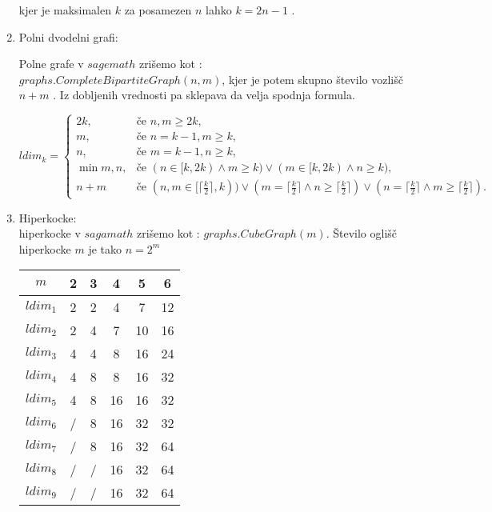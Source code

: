 \documentclass[12pt,a4paper]{amsart}
\theoremstyle{plain} %
\begin{document}
\begin{enumerate}
kjer je maksimalen $k$ za posamezen $n$ lahko $k = 2n -1$ .

\newpage

\item Polni dvodelni grafi:

Polne grafe v $sagemath$ zrišemo kot : $graphs.CompleteBipartiteGraph(n, m)$, kjer je potem skupno število vozlišč $n+m$ . 
Iz dobljenih vrednosti pa sklepava da velja spodnja formula. 

\begin{equation}
ldim_k =
\begin{cases}
  2k, & \text{če } n,m \geq 2k, \\
  m, & \text{če } n = k-1, m\geq k,\\
  n, & \text{če } m = k-1, n\geq k,\\
  \min{m,n}, & \text{če } (n \in [k,2k) \land  m\geq k) \lor (m \in [k,2k) \land  n\geq k) , \\
  n+m & \text{če } (n,m \in [\lceil \frac{k}{2} \rceil,k) ) \lor
  (m = \lceil \frac{k}{2} \rceil \land  n\geq \lceil \frac{k}{2} \rceil)  \lor
  (n = \lceil \frac{k}{2} \rceil \land  m\geq \lceil \frac{k}{2} \rceil) . \nonumber
   
   
  
\end{cases}
\end{equation}

\item Hiperkocke: \\

hiperkocke v $sagamath$ zrišemo kot :
$graphs.CubeGraph(m)$. Število  oglišč hiperkocke $m $
je tako $n= 2^m $

\begin{table}[h]
    \begin{center}
        \begin{tabular}{|c|c|c|c|c|c|}
            \hline
            $m$ & 2 & 3 & 4 & 5 & 6 \\
            \hline
            
            
            $ldim_1$ & 2 & 2 & 4 & 7 & 12 \\
            $ldim_2$ & 2 & 4 & 7 & 10 & 16 \\
            $ldim_3$ & 4 & 4 & 8 & 16 & 24 \\
            $ldim_4$ & 4 & 8 & 8 & 16 & 32 \\
            $ldim_5$ & 4 & 8 & 16 & 16 & 32 \\
            $ldim_6$ & / & 8 & 16 & 32 & 32 \\
            $ldim_7$ & / & 8 & 16 & 32 & 64 \\
            $ldim_8$ & / & / & 16 & 32 & 64 \\
            $ldim_9$ & / & / & 16 & 32 & 64 \\
            

\end{tabular}
\end{center}
\end{table}
\end{enumerate}
\end{document}
